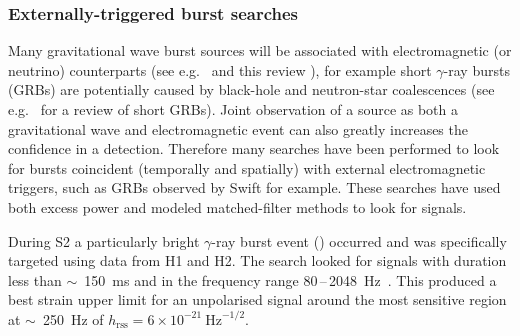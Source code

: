 \subsubsection{Externally-triggered burst searches}

Many gravitational wave burst sources will be associated with electromagnetic (or neutrino) counterparts 
(see e.g.\ \cite{2011CQGra..28k4013M} and this review \cite{2013CQGra..30s3002A}), for example short 
$\gamma$-ray bursts (GRBs) are potentially caused by black-hole and neutron-star coalescences (see e.g.\ 
\cite{2014ARA&A..52...43B} for a review of short GRBs). Joint observation of a source as both a gravitational 
wave and electromagnetic event can also greatly increases the confidence in a detection. Therefore many
searches have been performed to look for bursts coincident (temporally and spatially) with external 
electromagnetic triggers, such as GRBs observed by Swift for example. These searches have used both excess 
power and modeled matched-filter methods to look for signals.

During S2 a particularly bright $\gamma$-ray burst event () occurred and was 
specifically targeted using data from H1 and H2. The search looked for signals with duration less than 
$\sim$~150~ms and in the frequency range 80\,--\,2048~Hz~\cite{Abbott:2005d}. This produced a best strain 
upper limit for an unpolarised signal around the most sensitive region at  $\sim$~250~Hz of 
$h_{\mathrm{rss}}=6\times10^{-21} \mathrm{\ Hz}^{-1/2}$.


